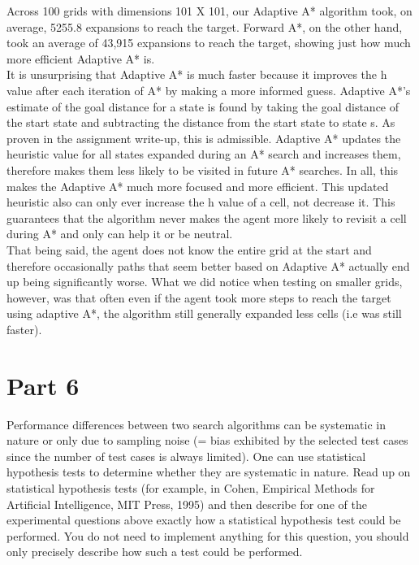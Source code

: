 \documentclass[12pt]{article}
\begin{document}
\begin{flushleft}
\hspace {1em}
Across 100 grids with dimensions 101 X 101, our Adaptive A* algorithm took, on
average, 5255.8 expansions to reach the target. Forward A*, on the other hand, took an
average of 43,915 expansions to reach the target, showing just how much more efficient
Adaptive A* is.
\\
\hspace {1em}
It is unsurprising that Adaptive A* is much faster because it improves the h value after
each iteration of A* by making a more informed guess. Adaptive A*’s estimate of the goal
distance for a state is found by taking the goal distance of the start state and subtracting the
distance from the start state to state s. As proven in the assignment write-up, this is admissible.
Adaptive A* updates the heuristic value for all states expanded during an A* search and
increases them, therefore makes them less likely to be visited in future A* searches. In all, this
makes the Adaptive A* much more focused and more efficient. This updated heuristic also can
only ever increase the h value of a cell, not decrease it. This guarantees that the algorithm
never makes the agent more likely to revisit a cell during A* and only can help it or be neutral.
\\
\hspace {1em}
That being said, the agent does not know the entire grid at the start and therefore
occasionally paths that seem better based on Adaptive A* actually end up being significantly
worse. What we did notice when testing on smaller grids, however, was that often even if the
agent took more steps to reach the target using adaptive A*, the algorithm still generally
expanded less cells (i.e was still faster).

\end{flushleft}

\section*{Part 6}
\begin{itshape}
Performance differences between two search algorithms can be systematic in nature or only due to sampling noise (= bias exhibited by the selected test cases since the number of test cases is always limited). One can use statistical hypothesis tests to determine whether they are systematic in nature. Read up on statistical hypothesis tests (for example, in Cohen, Empirical Methods for Artificial Intelligence, MIT Press, 1995) and then describe for one of the experimental questions above exactly how a statistical hypothesis test could be performed. You do not need
to implement anything for this question, you should only precisely describe how such a test could be performed.
\end{itshape}
\end{document}
